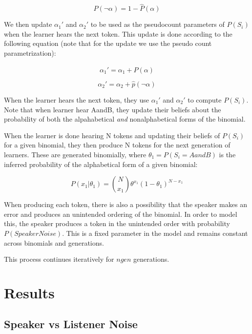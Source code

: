 \documentclass[10pt, letterpaper]{article}
\begin{document}
\begin{equation}
\label{eq:phatnotalpha}
\hat{P}(\neg\alpha) = 1 - \hat{P}(\alpha)
\end{equation}

We then update \(\alpha_1'\) and \(\alpha_2'\) to be used as the
pseudocount parameters of \(P(S_i)\) when the learner hears the next
token. This update is done according to the following equation (note
that for the update we use the pseudo count parametrization):

\begin{equation}
\label{eq:alpha1}
\alpha_1' = \alpha_1 + \hat{P}(\alpha)
\end{equation}

\begin{equation}
\label{eq:alpha2}
\alpha_2' = \alpha_2 + \hat{p}(\neg\alpha)
\end{equation}

When the learner hears the next token, they use \(\alpha_1'\) and
\(\alpha_2'\) to compute \(P(S_i)\). Note that when learner hear AandB,
they update their beliefs about the probability of both the
alpahabetical \emph{and} nonalphabetical forms of the binomial.

When the learner is done hearing N tokens and updating their beliefs of
\(P(S_i)\) for a given binomial, they then produce N tokens for the next
generation of learners. These are generated binomially, where
\(\theta_1 = P(S_i=AandB)\) is the inferred probability of the
alphabetical form of a given binomial:

\begin{equation}
\label{eq:binomialProd}
P(x_1|\theta_1) = \binom{N}{x_1} \theta^{x_1} (1-\theta_1)^{N-x_1}
\end{equation}

When producing each token, there is also a possibility that the speaker
makes an error and produces an unintended ordering of the binomial. In
order to model this, the speaker produces a token in the unintended
order with probability \(P(SpeakerNoise)\). This is a fixed parameter in
the model and remains constant across binomials and generations.

This process continues iteratively for \(ngen\) generations.

\hypertarget{results}{%
\section{Results}\label{results}}

\hypertarget{speaker-vs-listener-noise}{%
\subsection{Speaker vs Listener Noise}\label{speaker-vs-listener-noise}}
\end{document}

